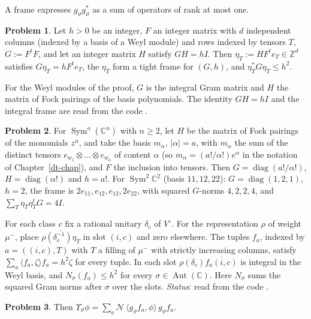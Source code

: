 \documentclass[reqno]{amsart}
\newcounter{chap}
\theoremstyle{definition}
\newtheorem{problem}{Problem}[section]
\theoremstyle{plain}
\theoremstyle{remark}
\newcommand{\Z}{{\mathbb{Z}}}
\newcommand{\C}{{\mathbb{C}}}
\newcommand{\Nc}{{\mathcal{N}}}
\newcommand{\Aut}{\operatorname{Aut}}
\newcommand{\Sym}{\operatorname{Sym}}
\newcommand{\vt}{\vartheta}
\begin{document}
A frame expresses \(g_\vt g_\vt^*\) as a sum of operators of rank at most one.

\begin{problem}\label{pr:frame}
Let \(h>0\) be an integer, \(F\) an integer matrix with \(d\) independent columns (indexed by a basis of a Weyl module) and rows indexed by tensors \(T\), \(G := F^tF\), and let an integer matrix \(H\) satisfy \(GH = hI\).  Then \(\eta_T := HF^te_T\in\Z^d\) satisfies \(G\eta_T = hF^te_T\), the \(\eta_T\) form a tight frame for \((G,h)\), and \(\eta_T^*G\eta_T\le h^2\).
\end{problem}

For the Weyl modules of the proof, \(G\) is the integral Gram matrix and \(H\) the matrix of Fock pairings of the basis polynomials.  The identity \(GH=hI\) and the integral frame are read from the code \cite[GramMatrix, lines 101, 447]{GL}.

\begin{problem}\label{pr:sym-frame}
For \(\Sym^a(\C^n)\) with \(n\ge2\), let \(H\) be the matrix of Fock pairings of the monomials \(z^\alpha\), and take the basis \(m_\alpha\), \(\lvert\alpha\rvert = a\), with \(m_\alpha\) the sum of the distinct tensors \(e_{w_1}\otimes\dots\otimes e_{w_a}\) of content \(\alpha\) (so \(m_\alpha = (a!/\alpha!)e^\alpha\) in the notation of Chapter~\ref{dt-chap}), and \(F\) the inclusion into tensors.  Then \(G = \operatorname{diag}(a!/\alpha!)\), \(H = \operatorname{diag}(\alpha!)\) and \(h = a!\).  For \(\Sym^2\C^2\) (basis \(11,12,22\)): \(G = \operatorname{diag}(1,2,1)\), \(h = 2\), the frame is \(2e_{11}, e_{12}, e_{12}, 2e_{22}\), with squared \(G\)-norms \(4,2,2,4\), and \(\sum_T\eta_T\eta_T^tG = 4I\).
\end{problem}

For each class \(c\) fix a rational unitary \(\delta_c\) of \(V^\circ\).  For the representation \(\rho\) of weight \(\mu^-\), place \(\overline{\rho(\delta_c^{-1})\eta_T}\) in slot \((i,c)\) and zero elsewhere.  The tuples \(f_a\), indexed by \(a=((i,c),T)\) with \(T\) a filling of \(\mu^-\) with strictly increasing columns, satisfy \(\sum_a\langle f_a,\zeta\rangle f_a=h^2\zeta\) for every tuple.  In each slot \(\rho(\delta_c)\overline{f_a(i,c)}\) is integral in the Weyl basis, and \(N_\sigma(f_a)\le h^2\) for every \(\sigma\in\Aut(\C)\).  Here \(N_\sigma\) sums the squared Gram norms after \(\sigma\) over the slots.  \emph{Status}: read from the code \cite[LiftVolumeHeight, line 350]{GL}.

\begin{problem}\label{pr:rank-one-sum}
Then \(\Upsilon_\vt\phi = \sum_a\Nc\,\langle g_\vt f_a,\phi\rangle\, g_\vt f_a\).
\end{problem}
\end{document}
